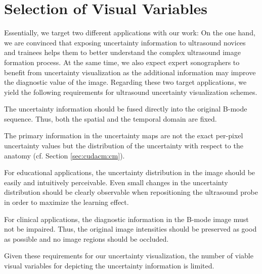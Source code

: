 \section{Selection of Visual Variables}
\label{sec:cmvis:selection-visual-variables}

Essentially, we target two different applications with our work:
On the one hand, we are convinced that exposing uncertainty information to ultrasound novices and trainees helps them to better understand the complex ultrasound image formation process.
At the same time, we also expect expert sonographers to benefit from uncertainty visualization as the additional information may improve the diagnostic value of the image.
Regarding these two target applications, we yield the following requirements for ultrasound uncertainty visualization schemes.
\begin{my_list_item}
	\item 
		The uncertainty information should be fused directly into the original B-mode sequence. Thus, both the spatial and the temporal domain are fixed.
		
	\item
		The primary information in the uncertainty maps are not the exact per-pixel uncertainty values but the distribution of the uncertainty with respect to the anatomy (cf. Section \ref{sec:cudacm:cm}).
		
	\item
		For educational applications, the uncertainty distribution in the image should be easily and intuitively perceivable. Even small changes in the uncertainty distribution should be clearly observable when repositioning the ultrasound probe in order to maximize the learning effect.
		
	\item
		For clinical applications, the diagnostic information in the B-mode image must not be impaired. Thus, the original image intensities should be preserved as good as possible and no image regions should be occluded.
\end{my_list_item}
Given these requirements for our uncertainty visualization, the number of viable visual variables for depicting the uncertainty information is limited.


